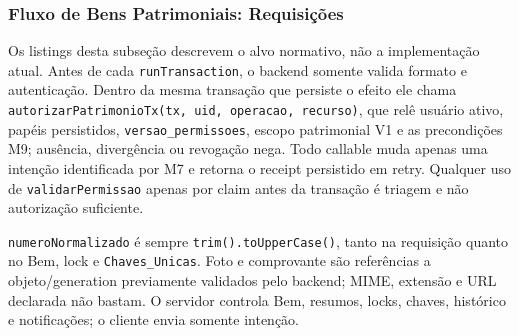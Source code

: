 \subsubsection{Fluxo de Bens Patrimoniais: Requisições}

\begin{regra}
Os listings desta subseção descrevem o alvo normativo, não a implementação
atual. Antes de cada \texttt{runTransaction}, o backend somente valida formato e
autenticação. Dentro da mesma transação que persiste o efeito ele chama
\texttt{autorizarPatrimonioTx(tx, uid, operacao, recurso)}, que relê usuário
ativo, papéis persistidos, \texttt{versao\_permissoes}, escopo patrimonial V1 e
as precondições M9; ausência, divergência ou revogação nega. Todo callable
muda apenas uma intenção identificada por M7 e retorna o receipt persistido em
retry. Qualquer uso de \texttt{validarPermissao} apenas por claim antes da
transação é triagem e não autorização suficiente.

\texttt{numeroNormalizado} é sempre \texttt{trim().toUpperCase()}, tanto na
requisição quanto no Bem, lock e \texttt{Chaves\_Unicas}. Foto e comprovante
são referências a objeto/generation previamente validados pelo backend; MIME,
extensão e URL declarada não bastam. O servidor controla Bem, resumos, locks,
chaves, histórico e notificações; o cliente envia somente intenção.
\end{regra}

